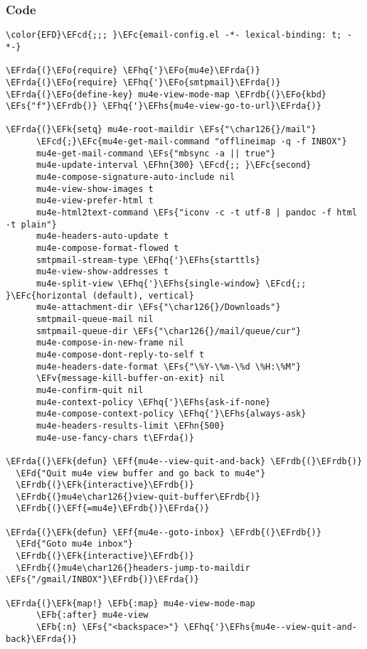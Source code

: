 \documentclass[a4wide,10pt]{article}
\newcommand{\EFc}[1]{\textcolor{EFc}{#1}} %
\newcommand{\EFcd}[1]{\textcolor{EFcd}{#1}} %
\newcommand{\EFs}[1]{\textcolor{EFs}{#1}} %
\newcommand{\EFd}[1]{\textcolor{EFd}{#1}} %
\newcommand{\EFk}[1]{\textcolor{EFk}{#1}} %
\newcommand{\EFb}[1]{\textcolor{EFb}{#1}} %
\newcommand{\EFf}[1]{\textcolor{EFf}{#1}} %
\newcommand{\EFv}[1]{\textcolor{EFv}{#1}} %
\newcommand{\EFo}[1]{\textcolor{EFo}{#1}} %
\newcommand{\EFhn}[1]{\textcolor{EFhn}{\textbf{#1}}} %
\newcommand{\EFhq}[1]{\textcolor{EFhq}{#1}} %
\newcommand{\EFhs}[1]{\textcolor{EFhs}{#1}} %
\newcommand{\EFrda}[1]{\textcolor{EFrda}{#1}} %
\newcommand{\EFrdb}[1]{\textcolor{EFrdb}{#1}} %
\begin{document}
\subsubsection{Code}
\label{sec:org6b0721f}
\begin{Code}
\begin{Verbatim}
\color{EFD}\EFcd{;;; }\EFc{email-config.el -*- lexical-binding: t; -*-}

\EFrda{(}\EFo{require} \EFhq{'}\EFo{mu4e}\EFrda{)}
\EFrda{(}\EFo{require} \EFhq{'}\EFo{smtpmail}\EFrda{)}
\EFrda{(}\EFo{define-key} mu4e-view-mode-map \EFrdb{(}\EFo{kbd} \EFs{"f"}\EFrdb{)} \EFhq{'}\EFhs{mu4e-view-go-to-url}\EFrda{)}

\EFrda{(}\EFk{setq} mu4e-root-maildir \EFs{"\char126{}/mail"}
      \EFcd{;}\EFc{mu4e-get-mail-command "offlineimap -q -f INBOX"}
      mu4e-get-mail-command \EFs{"mbsync -a || true"}
      mu4e-update-interval \EFhn{300} \EFcd{;; }\EFc{second}
      mu4e-compose-signature-auto-include nil
      mu4e-view-show-images t
      mu4e-view-prefer-html t
      mu4e-html2text-command \EFs{"iconv -c -t utf-8 | pandoc -f html -t plain"}
      mu4e-headers-auto-update t
      mu4e-compose-format-flowed t
      smtpmail-stream-type \EFhq{'}\EFhs{starttls}
      mu4e-view-show-addresses t
      mu4e-split-view \EFhq{'}\EFhs{single-window} \EFcd{;; }\EFc{horizontal (default), vertical}
      mu4e-attachment-dir \EFs{"\char126{}/Downloads"}
      smtpmail-queue-mail nil
      smtpmail-queue-dir \EFs{"\char126{}/mail/queue/cur"}
      mu4e-compose-in-new-frame nil
      mu4e-compose-dont-reply-to-self t
      mu4e-headers-date-format \EFs{"\%Y-\%m-\%d \%H:\%M"}
      \EFv{message-kill-buffer-on-exit} nil
      mu4e-confirm-quit nil
      mu4e-context-policy \EFhq{'}\EFhs{ask-if-none}
      mu4e-compose-context-policy \EFhq{'}\EFhs{always-ask}
      mu4e-headers-results-limit \EFhn{500}
      mu4e-use-fancy-chars t\EFrda{)}

\EFrda{(}\EFk{defun} \EFf{mu4e--view-quit-and-back} \EFrdb{(}\EFrdb{)}
  \EFd{"Quit mu4e view buffer and go back to mu4e"}
  \EFrdb{(}\EFk{interactive}\EFrdb{)}
  \EFrdb{(}mu4e\char126{}view-quit-buffer\EFrdb{)}
  \EFrdb{(}\EFf{=mu4e}\EFrdb{)}\EFrda{)}

\EFrda{(}\EFk{defun} \EFf{mu4e--goto-inbox} \EFrdb{(}\EFrdb{)}
  \EFd{"Goto mu4e inbox"}
  \EFrdb{(}\EFk{interactive}\EFrdb{)}
  \EFrdb{(}mu4e\char126{}headers-jump-to-maildir \EFs{"/gmail/INBOX"}\EFrdb{)}\EFrda{)}

\EFrda{(}\EFk{map!} \EFb{:map} mu4e-view-mode-map
      \EFb{:after} mu4e-view
      \EFb{:n} \EFs{"<backspace>"} \EFhq{'}\EFhs{mu4e--view-quit-and-back}\EFrda{)}


\end{Verbatim}
\end{Code}
\end{document}
